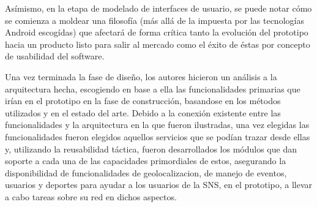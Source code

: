 Asímismo, en la etapa de modelado de interfaces de usuario, se puede notar cómo se comienza a moldear una filosofía (más allá de la impuesta por las tecnologías Android escogídas) que afectará de forma crítica tanto la evolución del prototipo hacia un producto listo para salir al mercado como el éxito de éstas por concepto de usabilidad del software.

Una vez terminada la fase de diseño, los autores hicieron un análisis a la arquitectura hecha, escogiendo en base a ella las funcionalidades primarias que irían en el prototipo en la fase de construcción, basandose en los métodos utilizados y en el estado del arte. Debido a la conexión existente entre las funcionalidades y la arquitectura en la que fueron ilustradas, una vez elegidas las funcionalidades fueron elegidos aquellos servicios que se podían trazar desde ellas y, utilizando la reusabilidad táctica, fueron desarrollados los módulos que dan soporte a cada una de las capacidades primordiales de estos, asegurando la disponibilidad de funcionalidades de geolocalizacion, de manejo de eventos, usuarios y deportes para ayudar a los usuarios de la SNS, en el prototipo, a llevar a cabo tareas sobre su red en dichos aspectos.
